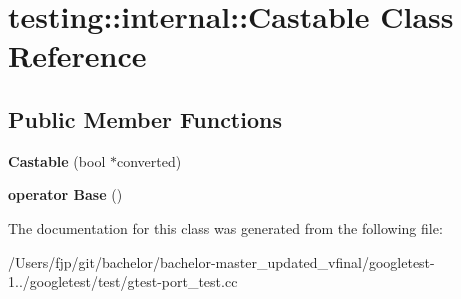 \hypertarget{classtesting_1_1internal_1_1_castable}{}\section{testing\+:\+:internal\+:\+:Castable Class Reference}
\label{classtesting_1_1internal_1_1_castable}
\subsection*{Public Member Functions}
\begin{DoxyCompactItemize}
\item 
\mbox{\label{classtesting_1_1internal_1_1_castable_a705d519a227d38ff5c174905316f62c4}} 
{\bfseries Castable} (bool $\ast$converted)
\item 
\mbox{\label{classtesting_1_1internal_1_1_castable_ac60b2e7885f3b09defb829eddaa0afd9}} 
{\bfseries operator Base} ()
\end{DoxyCompactItemize}


The documentation for this class was generated from the following file\+:\begin{DoxyCompactItemize}
\item 
/\+Users/fjp/git/bachelor/bachelor-\/master\+\_\+updated\+\_\+vfinal/googletest-\/1../googletest/test/gtest-\/port\+\_\+test.\+cc\end{DoxyCompactItemize}
